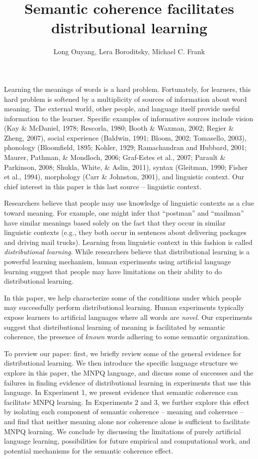 \documentclass[man,floatsintext]{apa6}
\title{Semantic coherence facilitates distributional learning}
\author{Long Ouyang, Lera Boroditsky, Michael C. Frank}
\affiliation{Stanford University}
\begin{document}
\maketitle

Learning the meanings of words is a hard problem. Fortunately, for learners, this hard problem is softened by a multiplicity of sources of information about word meaning. The external world, other people, and language itself provide useful information to the learner. Specific examples of informative sources include vision (Kay \& McDaniel, 1978; Rescorla, 1980; Booth \& Waxman, 2002; Regier \& Zheng, 2007), social experience (Baldwin, 1991; Bloom, 2002; Tomasello, 2003), phonology (Bloomfield, 1895; Kohler, 1929; Ramachandran and Hubbard, 2001; Maurer, Pathman, \& Mondloch, 2006; Graf-Estes et al., 2007; Parault \& Parkinson, 2008; Shukla, White, \& Aslin, 2011), syntax (Gleitman, 1990; Fisher et al., 1994), morphology (Carr \& Johnston, 2001), and linguistic context. Our chief interest in this paper is this last source -- linguistic context.

Researchers believe that people may use knowledge of linguistic contexts as a clue toward meaning. For example, one might infer that ``postman'' and ``mailman'' have similar meanings based solely on the fact that they occur in similar linguistic contexts (e.g., they both occur in sentences about delivering packages and driving mail trucks). Learning from linguistic context in this fashion is called \emph{distributional learning}. While researchers believe that distributional learning is a powerful learning mechanism, human experiments using artificial language learning suggest that people may have limitations on their ability to do distributional learning.
 
In this paper, we help characterize some of the conditions under which people may successfully perform distributional learning. Human experiments typically expose learners to artificial languages where all words are \emph{novel}. Our experiments suggest that distributional learning of meaning is facilitated by semantic coherence, the presence of \emph{known} words adhering to some semantic organization.

To preview our paper: first, we briefly review some of the general evidence for distributional learning. We then introduce the specific language structure we explore in this paper, the MNPQ language, and discuss some of successes and the failures in finding evidence of distributional learning in experiments that use this language. In Experiment 1, we present evidence that semantic coherence can facilitate MNPQ learning. In Experiments 2 and 3, we further explore this effect by isolating each component of semantic coherence -- meaning and coherence -- and find that neither meaning alone nor coherence alone is sufficient to facilitate MNPQ learning. We conclude by discussing the limitations of purely artificial language learning, possibilities for future empirical and computational work, and potential mechanisms for the semantic coherence effect.
 
\end{document}
